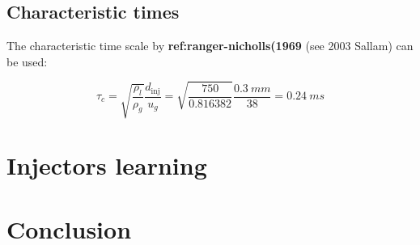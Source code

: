 
\subsection{Characteristic times}

The characteristic time scale by \textbf{ref:ranger-nicholls(1969} (see 2003 Sallam) can be used:

\begin{equation}
\tau_c = \sqrt{\frac{\rho_l}{\rho_g}} \frac{d_\mathrm{inj}}{u_g} = \sqrt{\frac{750}{0.816382 }} \frac{0.3 ~mm}{38} = 0.24 ~ms
\end{equation}

%
%

\section{Injectors learning}

\section{Conclusion}

